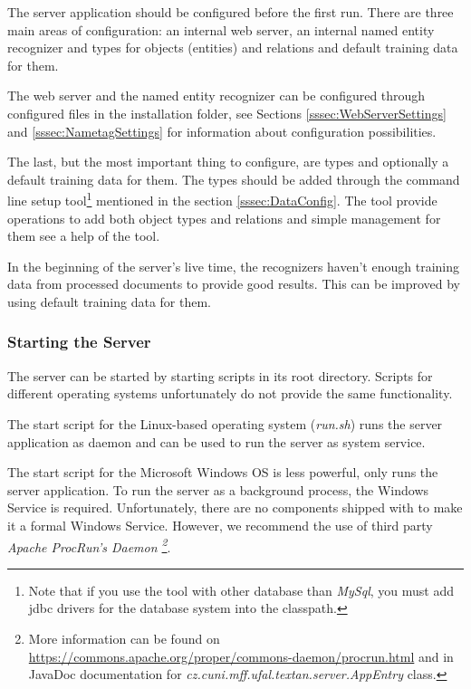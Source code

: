 The \textan{} server application should be configured before the first run. There
are three main areas of configuration: an internal web server, an internal named
entity recognizer and types for objects (entities) and relations and default training
data for them.

The web server and the named entity recognizer can be configured through configured
files in the installation folder, see Sections \ref{sssec:WebServerSettings} and
\ref{sssec:NametagSettings} for information about configuration possibilities.

The last, but the most important thing to configure, are types and optionally
a default training data for them. The types should be added through the command
line setup tool\footnote{Note that if you use the tool with other database than
\emph{MySql}, you must add jdbc drivers for the database system into the classpath.}
mentioned in the section \ref{sssec:DataConfig}. The tool provide operations to
add both object types and relations and simple management for them see a help of
the tool.

In the beginning of the server's live time, the recognizers haven't enough training
data from processed documents to provide good results. This can be improved by
using default training data for them.

\subsubsection{Starting the Server}

The server can be started by starting scripts in its root directory. Scripts for
different operating systems unfortunately do not provide the same functionality.

The start script for the Linux-based operating system (\emph{run.sh}) runs the
server application as daemon and can be used to run the server as system service.

The start script for the Microsoft Windows OS is less powerful, only runs the
server application. To run the server as a background process, the Windows
Service is required. Unfortunately, there are no components shipped with
\textan{} to make it a formal Windows Service. However, we recommend the use of
third party \emph{Apache Proc\-Run's Daemon \footnote{More information can be
found on \url{https://commons.apache.org/proper/commons-daemon/procrun.html}
and in JavaDoc documentation for \emph{cz.cuni.mff.ufal.textan.server.AppEntry}
class.}}.

